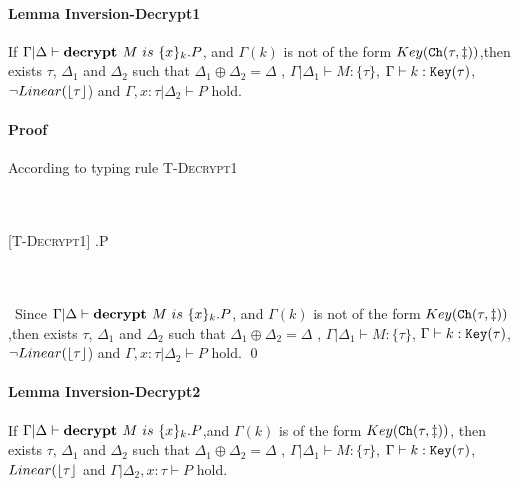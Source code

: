 \documentclass[master,english]{kuisthesis}
\theoremstyle{definition}
\begin{document}
\paragraph{Lemma Inversion-Decrypt1}  If $\Gamma |\Delta \vdash \textbf{decrypt }{M}~is~\{{x}\}_{k}.P$, and $\Gamma (k)$ is not of the form $Key({\tt Ch}({\tau, \ddagger})) $,then exists $\tau$, $\Delta_1$ and $\Delta_2 $ such that $\Delta_1 \oplus \Delta_2 =\Delta $ ,  $\Gamma|\Delta_1 \vdash M : \{\tau\}$, $\Gamma \vdash k : {\tt Key}({\tau})$, $\neg Linear(\lfloor {\tau} \rfloor$) and  $\Gamma, x:\tau | \Delta_2  \vdash P $ hold.
\paragraph{Proof}  According to typing rule \textsc{T-Decrypt1}
\ \\ \ \\ \ 
\begin{center}
\begin{prooftree}
[\textsc{T-Decrypt1}]{
 \vdash {}.P
}
\end{prooftree}
\end{center}
\ \\ \ \\ \ 
Since $\Gamma |\Delta \vdash \textbf{decrypt }{M}~is~\{{x}\}_{k}.P$, and $\Gamma (k)$ is not of the form $Key({\tt Ch}({\tau, \ddagger})) $,then exists $\tau$, $\Delta_1$ and $\Delta_2 $ such that $\Delta_1 \oplus \Delta_2 =\Delta $ ,  $\Gamma|\Delta_1 \vdash M : \{\tau\}$, $\Gamma \vdash k : {\tt Key}({\tau})$, $\neg Linear(\lfloor {\tau} \rfloor$) and  $\Gamma, x:\tau | \Delta_2  \vdash P $ hold.
\qed

\paragraph{Lemma Inversion-Decrypt2}  If $\Gamma |\Delta \vdash \textbf{decrypt }{M}~is~\{{x}\}_{k}.P$,and $\Gamma (k)$ is of the form $Key({\tt Ch}({\tau, \ddagger})) $, then exists $\tau$, $\Delta_1$ and $\Delta_2 $ such that $\Delta_1 \oplus \Delta_2 =\Delta $ ,   $\Gamma|\Delta_1 \vdash M : \{\tau\}$, $\Gamma \vdash k : {\tt Key}({\tau})$, $ Linear(\lfloor {\tau} \rfloor$ and  $\Gamma | \Delta_2, x:\tau  \vdash P $ hold.
\end{document}
